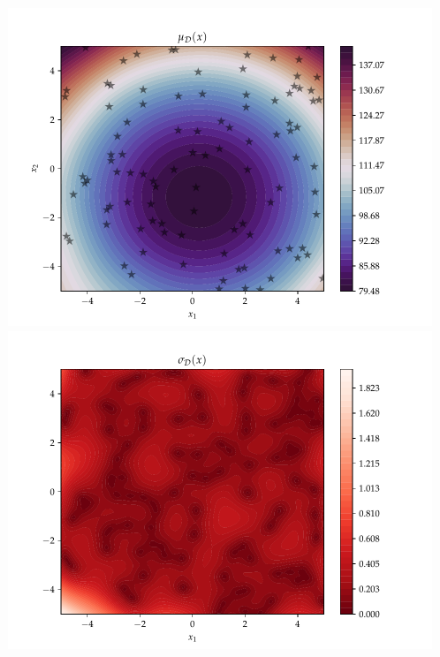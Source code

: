 \begin{figure}[h]
   \begin{minipage}[b]{0.49\textwidth}
    \includegraphics[trim=1.2cm 0.7cm 2cm 1cm,clip,width=\textwidth]{Figures/coco_reg/f1_Gaussian Process - sklearn2.pdf}
   \end{minipage}
   \hfill
   \begin{minipage}[b]{0.49\textwidth}
     \includegraphics[trim=1.2cm 0.7cm 2cm 1cm,clip,width=\textwidth]{Figures/coco_reg/f1_Gaussian Process - sklearn3.pdf}
    \end{minipage}


\end{figure}
